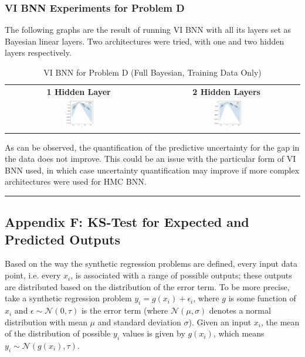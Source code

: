 \documentclass[conference]{IEEEtran}
\begin{document}
\subsubsection{VI BNN Experiments for Problem D}
The following graphs are the result of running VI BNN with all its layers set as Bayesian linear layers. Two architectures were tried, with one and two hidden layers respectively.

\begin{table}[H]
\centering
\begin{tabular}{cc}
\textbf{1 Hidden Layer} & \textbf{2 Hidden Layers}\\
\includegraphics[width=0.21\textwidth]{images/vi_bnn--problem_D--sb--full_bayesian.png} & \includegraphics[width=0.21\textwidth]{images/vi_bnn--problem_D--sb--full_bayesian--2_hidden_layers.png}
\end{tabular}
\caption{VI BNN for Problem D (Full Bayesian, Training Data Only)}
\label{tb5:table_of_figures}
\end{table}

As can be observed, the quantification of the predictive uncertainty for the gap in the data does not improve. This could be an issue with the particular form of VI BNN used, in which case uncertainty quantification may improve if more complex architectures were used for HMC BNN.

\par\noindent\rule{0.49\textwidth}{0.1pt}

\subsection*{Appendix F: KS-Test for Expected and Predicted Outputs}
Based on the way the synthetic regression problems are defined, every input data point, i.e. every $x_i$, is associated with a range of possible outputs; these outputs are distributed based on the distribution of the error term. To be more precise, take a synthetic regression problem $y_i = g(x_i) + \epsilon_i$, where $g$ is some function of $x_i$ and $\epsilon \sim \mathcal{N}(0, \tau)$ is the error term (where $\mathcal{N}(\mu, \sigma)$ denotes a normal distribution with mean $\mu$ and standard deviation $\sigma$). Given an input $x_i$, the mean of the distribution of possible $y_i$ values is given by $g(x_i)$, which means $y_i \sim \mathcal{N}(g(x_i), \tau)$.\\
\end{document}
